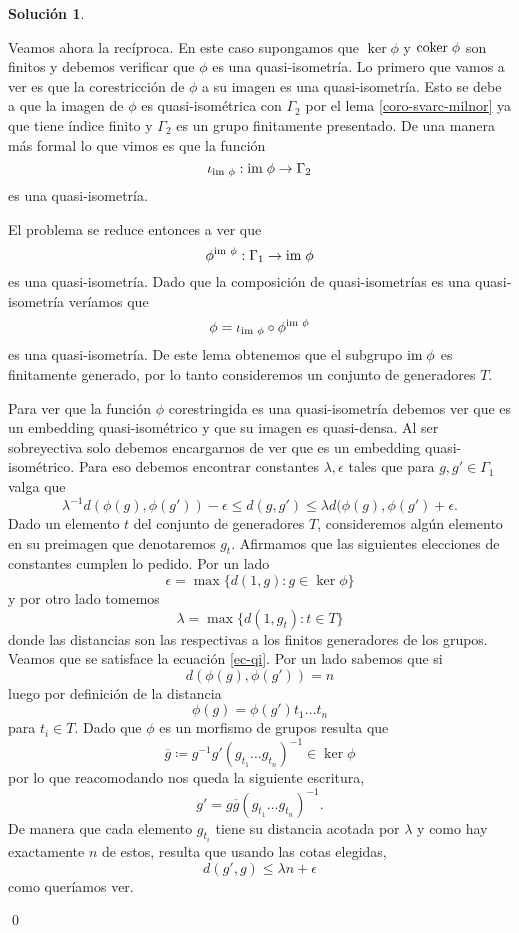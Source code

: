 \documentclass[11pt]{article}
\theoremstyle{plain}
\theoremstyle{definition}
\newtheorem*{sol}{Solución}
\theoremstyle{remark}
\newcommand\coker{\text{coker} \hspace{0.1cm} \phi}
\newcommand\im{\text{im} \hspace{0.1cm} \phi}
\newcommand\ol{\overline}
\begin{document}
\begin{sol}
\begin{itemize}
		Veamos ahora la recíproca. En este caso supongamos que $\ker \phi$ y $\coker$ son finitos y debemos verificar que $\phi$ es una quasi-isometría. Lo primero que vamos a ver es que la corestricción de $\phi$ a su imagen es una quasi-isometría. Esto se debe a que la imagen de $\phi$ es quasi-isométrica con $\Gamma_2$ por el lema \ref{coro-svarc-milnor} ya que tiene índice finito y $\Gamma_2$ es un grupo finitamente presentado. De una manera más formal lo que vimos es que la función
		\[
		\iota_{\im}: \im \to \Gamma_2
		\]
		es una quasi-isometría.
		
		\medskip
		
		El problema se reduce entonces a ver que 
		\[
		\phi^{\im}: \Gamma_1 \to \im
		\]
		es una quasi-isometría. Dado que la composición de quasi-isometrías es una quasi-isometría veríamos que
		\[
		\phi = \iota_{\im} \circ \phi^{\im} 
		\]
		es una quasi-isometría. De este lema obtenemos que el subgrupo $\im$ es finitamente generado, por lo tanto consideremos un conjunto de generadores $T$.
		
		\medskip
		
		Para ver que la función $\phi$ corestringida es una quasi-isometría debemos ver que es un embedding quasi-isométrico y que su imagen es quasi-densa. Al ser sobreyectiva solo debemos encargarnos de ver que es un embedding quasi-isométrico. Para eso debemos encontrar constantes $\lambda, \epsilon$ tales que para $g, g' \in \Gamma_1$ valga que
		\begin{equation}\label{ec-qi}
		\lambda^{-1} d(\phi(g), \phi(g')) - \epsilon \le d(g,g') \le \lambda d(\phi(g), \phi(g') + \epsilon.
		\end{equation}
		Dado un elemento $t$ del conjunto de generadores $T$, consideremos algún elemento en su preimagen que denotaremos $g_t$.
		Afirmamos que las siguientes elecciones de constantes cumplen lo pedido. Por un lado
		\[
		\epsilon = \max \{ d(1,g) : g \in \ker \phi \}
		\]
		y por otro lado tomemos
		\[
		\lambda = \max \{  d(1,g_t): t \in T \}
		\]
		donde las distancias son las respectivas a los finitos generadores de los grupos. Veamos que se satisface la ecuación \ref{ec-qi}. Por un lado sabemos que si
		\[
		d(\phi(g),\phi(g')) = n
		\]
		luego por definición de la distancia
		\[
		\phi(g) = \phi(g') t_1 \dots {t_n}
		\]
		para $t_i \in T$. Dado que $\phi$ es un morfismo de grupos resulta que
		\[
		\ol g \coloneqq g^{-1}g' (g_{t_1} \dots g_{t_n})^{-1} \in \ker \phi
		\]
		por lo que reacomodando nos queda la siguiente escritura,
		\[
		g' = g \ol g (g_{t_1} \dots g_{t_n})^{-1}.
		\]
		De manera que cada elemento $g_{t_i}$ tiene su distancia acotada por $\lambda$ y como hay exactamente $n$ de estos, resulta que usando las cotas elegidas,
		\[
		d(g',g) \le \lambda n + \epsilon 
		\]
		como queríamos ver.
	\end{itemize}
	
	
	\qed
\end{sol}
\end{document}
